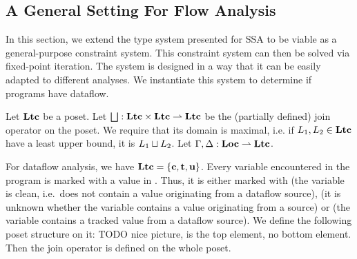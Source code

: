 \subsection{A General Setting For Flow Analysis}
In this section, we extend the type system presented for SSA to be viable as a
general-purpose constraint system.
This constraint system can then be solved via fixed-point iteration.
The system is designed in a way that it can be easily adapted to different analyses.
We instantiate this system to determine if programs have dataflow.

Let $\textbf{Ltc}$ be a poset.
Let $\mathop\bigsqcup: \textbf{Ltc} \times \textbf{Ltc} \rightharpoonup \textbf{Ltc}$ be the (partially defined)
join operator on the poset.
We require that its domain is maximal, i.e. if $L_1, L_2 \in \textbf{Ltc}$ have a least upper
bound, it is $L_1 \mathbin\sqcup L_2$.
Let $\Gamma, \Delta: \textbf{Loc} \rightharpoonup \textbf{Ltc}$.

For dataflow analysis, we have $\textbf{Ltc} = \{\textbf{c}, \textbf{t}, \textbf{u}\}$.
Every variable encountered in the program is marked with a value in \lattice.
Thus, it is either marked with \lclean{} (the variable
is clean, i.e.\ does not contain a value originating from a dataflow source), \lunknown{}
(it is unknown whether the variable contains a value originating from a source) or \ltracked{}
(the variable contains a tracked value from a dataflow source).
We define the following poset structure on it:
TODO nice picture, \lunknown{} is the top element, no bottom element.
Then the join operator is defined on the whole poset.

